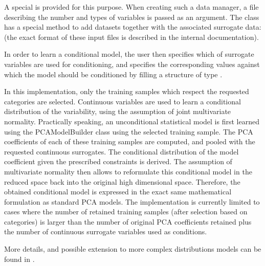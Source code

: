 \documentclass{InsightArticle}
\begin{document}
A special  is provided for this
purpose. When creating such a data manager, a file describing the
number and types of variables is passed as an argument.  The class has
a special method to add datasets together with the associated
surrogate data: 
(the exact format of these input files is described in the internal documentation).

In order to learn a conditional model, the user then specifies which
of surrogate variables are used for conditioning, and specifies the
corresponding values against which the model should be conditioned by
filling a structure of type .

In this implementation, only the training samples which respect the
requested categories are selected.  Continuous variables are used to
learn a conditional distribution of the variability, using the 
assumption of joint multivariate normality. Practically speaking, an
unconditional statistical model is first learned using the
PCAModelBuilder class using the selected training sample. The PCA
coefficients of each of these training samples are computed, and
pooled with the requested continuous surrogates. The
conditional distribution of the model coefficient given the prescribed
constraints is derived. The assumption of multivariate normality then
allows to reformulate this conditional model in the reduced space back
into the original high dimensional space. Therefore, the obtained
conditional model is expressed in the exact same mathematical
formulation as standard PCA models.  The implementation is currently
limited to cases where the number of retained training samples (after
selection based on categories) is larger than the number of original
PCA coefficients retained plus the number of continuous surrogate
variables used as conditions.

More details, and possible extension to more complex distributions
models can be found in \cite{blanc_conditional_2009}.
\end{document}
